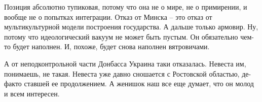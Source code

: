 Позиция абсолютно тупиковая, потому что она не о мире, не о примирении, и
вообще не о попытках интеграции. Отказ от Минска – это отказ от
мультикультурной модели построения государства. А дальше только армовир. Ну,
потому что идеологический вакуум не может быть пустым. Он обязательно чем-то
будет наполнен. И, похоже, будет снова наполнен вятровичами.

А от неподконтрольной части Донбасса Украина таки отказалась. Невеста им,
понимаешь, не такая. Невеста уже давно сношается с Ростовской областью,
де-факто ставшей ее продолжением. А женишок наш все еще думает, что он молод и
всем интересен.

